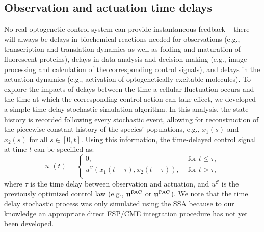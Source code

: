 \documentclass[12pt]{article}
\begin{document}
\subsection{Observation and actuation time delays}
No real optogenetic control system can provide instantaneous feedback -- there will always be delays in biochemical reactions needed for observations (e.g., transcription and translation dynamics as well as folding and maturation of fluorescent proteins), delays in data analysis and decision making (e.g., image processing and calculation of the corresponding control signals), and delays in the actuation dynamics (e.g., activation of optogenetically excitable molecules).  To explore the impacts of delays between the time a cellular fluctuation occurs and the time at which the corresponding control action can take effect, we developed a simple time-delay stochastic simulation algorithm. In this analysis, the state history is recorded following every stochastic event, allowing for reconstruction of the piecewise constant history of the species' populations, e.g., $x_1(s)$ and $x_2(s)$ for all $s\in [0,t]$.  Using this information, the time-delayed control signal at time $t$ can be specified as: 
\begin{equation}
u_{\tau}(t)=\left\{
\begin{array}{rl}
      0 ,&\text{ for }  t \leq \tau, \\
      {u}^{\mathcal{C}}(x_1(t-\tau), x_2(t-\tau)) , &\text{ for }   t > \tau,\\
\end{array}\right. 
\label{timeDelaySSA}
\end{equation}
where $\tau$ is the time delay between observation and actuation, and ${u}^{\mathcal{C}}$ is the previously optimized control law (e.g., $\mathbf{u}^{\rm FAC}$ or $\mathbf{u}^{\rm PAC}$). We note that the time delay stochastic process was only simulated using the SSA because to our knowledge an appropriate direct FSP/CME integration procedure has not yet been developed.
\end{document}
